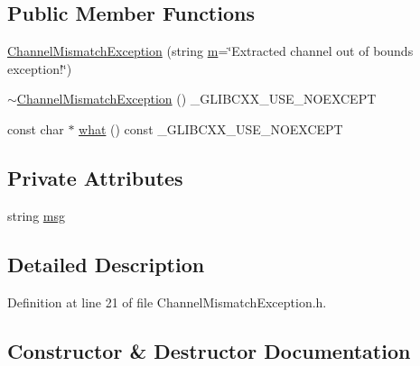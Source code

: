 \subsection*{Public Member Functions}
\begin{DoxyCompactItemize}
\item 
\hyperlink{class_vision_1_1_exception_1_1_channel_mismatch_exception_a6fcbebd5e804c5b76b24506fe558d656}{Channel\+Mismatch\+Exception} (string \hyperlink{_gen_blob_8m_ab3cd915d758008bd19d0f2428fbb354a}{m}=\char`\"{}Extracted channel out of bounds exception!\char`\"{})
\item 
\hyperlink{class_vision_1_1_exception_1_1_channel_mismatch_exception_abef15b64f935832cc516696b68f6a012}{$\sim$\+Channel\+Mismatch\+Exception} () \+\_\+\+G\+L\+I\+B\+C\+X\+X\+\_\+\+U\+S\+E\+\_\+\+N\+O\+E\+X\+C\+E\+P\+T
\item 
const char $\ast$ \hyperlink{class_vision_1_1_exception_1_1_channel_mismatch_exception_acd5341496b3b5f49bba41c238a398a70}{what} () const \+\_\+\+G\+L\+I\+B\+C\+X\+X\+\_\+\+U\+S\+E\+\_\+\+N\+O\+E\+X\+C\+E\+P\+T
\end{DoxyCompactItemize}
\subsection*{Private Attributes}
\begin{DoxyCompactItemize}
\item 
string \hyperlink{class_vision_1_1_exception_1_1_channel_mismatch_exception_afa6ced18d6bf6cde0f907cb722470d60}{msg}
\end{DoxyCompactItemize}


\subsection{Detailed Description}


Definition at line 21 of file Channel\+Mismatch\+Exception.\+h.



\subsection{Constructor \& Destructor Documentation}
\hypertarget{class_vision_1_1_exception_1_1_channel_mismatch_exception_a6fcbebd5e804c5b76b24506fe558d656}{}
